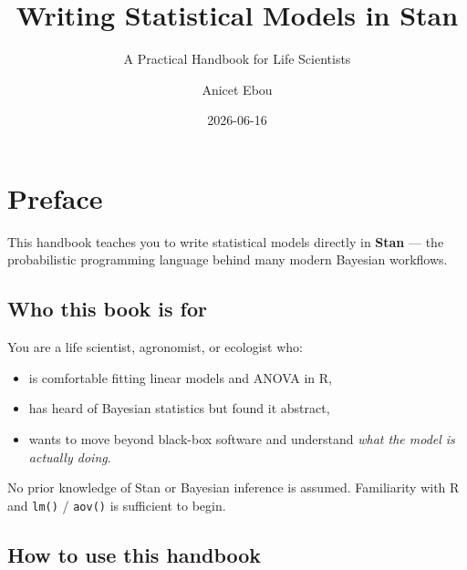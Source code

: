 \documentclass[
  11pt,
  a4paper,
  oneside,
  openany]{scrbook}
\title{Writing Statistical Models in Stan}
\subtitle{A Practical Handbook for Life Scientists}
\author{Anicet Ebou}
\date{2026-06-16}
\providecommand{\tightlist}{%
  \setlength{\itemsep}{0pt}\setlength{\parskip}{0pt}}\usepackage{longtable,booktabs,array}
\renewcommand*\contentsname{Table of contents}
\newcommand\contentsname{Table of contents}
\begin{document}
\frontmatter
\maketitle

\renewcommand*\contentsname{Table of contents}
{
\hypersetup{linkcolor=}
\setcounter{tocdepth}{1}
\tableofcontents
}

\mainmatter
{}

\chapter*{Preface}\label{preface}


This handbook teaches you to write statistical models directly in
\textbf{Stan} --- the probabilistic programming language behind many
modern Bayesian workflows.

\section*{Who this book is for}\label{who-this-book-is-for}


You are a life scientist, agronomist, or ecologist who:

\begin{itemize}
\tightlist
\item
  is comfortable fitting linear models and ANOVA in R,
\item
  has heard of Bayesian statistics but found it abstract,
\item
  wants to move beyond black-box software and understand \emph{what the
  model is actually doing}.
\end{itemize}

No prior knowledge of Stan or Bayesian inference is assumed. Familiarity
with R and \texttt{lm()} / \texttt{aov()} is sufficient to begin.

\section*{How to use this handbook}\label{how-to-use-this-handbook}

\end{document}
